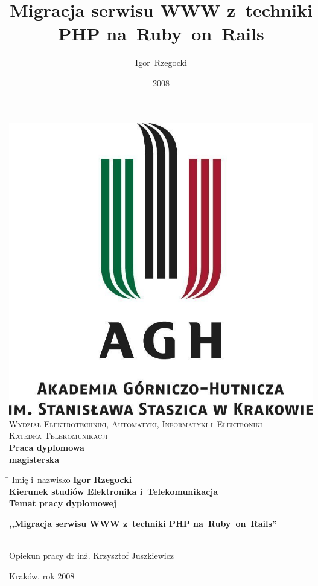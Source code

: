 \documentclass[a4paper,12pt,oneside]{report}
\author{Igor~Rzegocki}
\title{Migracja serwisu WWW z~techniki PHP na~Ruby~on~Rails}
\date{2008}
\begin{document}
\begin{titlepage}
  \begin{center}
  \includegraphics[keepaspectratio]{agh-logo.jpg}\\[0.5cm]
  \textsc{\large Wydział Elektrotechniki, Automatyki, Informatyki i~Elektroniki}\\[0.5cm]
  \textsc{\large Katedra Telekomunikacji}\\[1.5cm]
  \textbf{\huge Praca dyplomowa}\\[1cm]
  \textbf{\large magisterska}\\[2.5cm]
  \begin{tabbing}
    \hspace{0.45\textwidth}\=\kill
    \large Imię i~nazwisko \> \large \bfseries Igor Rzegocki\\[0.25cm]
    \large Kierunek studiów \> \large Elektronika i~Telekomunikacja\\[0.25cm]
    \large Temat pracy dyplomowej \> \parbox{0.55\textwidth}{\large \bfseries ,,Migracja serwisu WWW z~techniki PHP na~Ruby~on~Rails''}\\[2cm]
    \large Opiekun pracy \> \large dr inż. Krzysztof Juszkiewicz\\[2cm]
  \end{tabbing}
  \vfill
  {\large Kraków, rok 2008}
  \end{center}
\end{titlepage}
\end{document}
